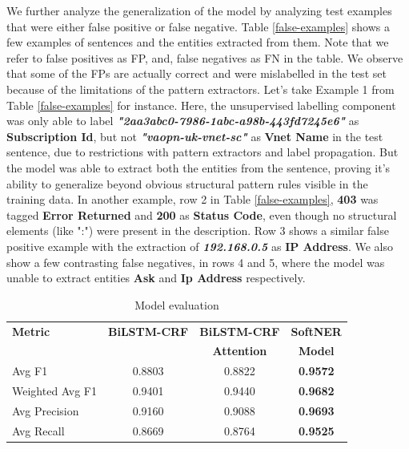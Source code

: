We further analyze the generalization of the model by analyzing test examples that were either false positive or false negative. Table \ref{false-examples} shows a few examples of sentences and the entities extracted from them. Note that we refer to false positives as FP, and, false negatives as FN in the table. We observe that some of the FPs are actually correct and were mislabelled in the test set because of the limitations of the pattern extractors. Let's take Example 1 from Table \ref{false-examples} for instance. Here, the unsupervised labelling component was only able to label \textbf{\textit{"2aa3abc0-7986-1abc-a98b-443fd7245e6"}} as \textbf{Subscription Id}, but not \textbf{\textit{"vaopn-uk-vnet-sc"}} as \textbf{Vnet Name} in the test sentence, due to restrictions with pattern extractors and label propagation. But the \softner{} model was able to extract both the entities from the sentence, proving it's ability to generalize beyond obvious structural pattern rules visible in the training data. In another example, row 2 in Table \ref{false-examples}, \textbf{403} was tagged \textbf{Error Returned} and \textbf{200} as \textbf{Status Code}, even though no structural elements (like ":") were present in the description. Row 3 shows a similar false positive example with the extraction of \textbf{\textit{192.168.0.5}} as \textbf{IP Address}. We also show a few contrasting false negatives, in rows 4 and 5, where the model was unable to extract entities \textbf{Ask} and \textbf{Ip Address} respectively.

\begin{table}
\small
\caption{Model evaluation}\vspace{-6pt}
\label{model-evaluation}
 \begin{tabular}[t]{lccc} 
\toprule
 \textbf{Metric} & \textbf{BiLSTM-CRF} & \textbf{BiLSTM-CRF} & \textbf{SoftNER} \\
  &  & \textbf{ Attention} & \textbf{Model} \\
 \midrule
 Avg F1 & 0.8803 & 0.8822 & \textbf{0.9572} \\
 Weighted Avg F1 &  0.9401 & 0.9440 & \textbf{0.9682} \\
 Avg Precision & 0.9160 & 0.9088 & \textbf{0.9693} \\
 Avg Recall &  0.8669 & 0.8764 & \textbf{0.9525} \\
 \bottomrule
\end{tabular}
\end{table}


